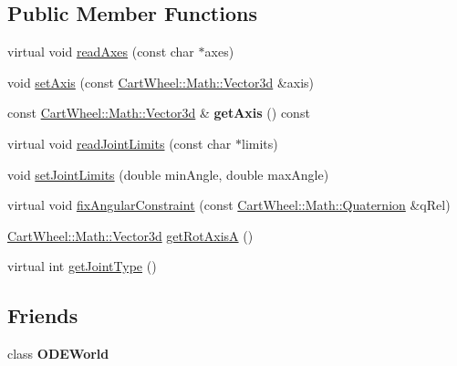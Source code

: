 \subsection*{Public Member Functions}
\begin{DoxyCompactItemize}
\item 
virtual void \hyperlink{classCartWheel_1_1Physics_1_1HingeJoint_a03be2b3b0d8b82d646f2c5b343d19faa}{readAxes} (const char $\ast$axes)
\item 
void \hyperlink{classCartWheel_1_1Physics_1_1HingeJoint_ad1f3776125f03d67f5abbc90453d28ce}{setAxis} (const \hyperlink{classCartWheel_1_1Math_1_1Vector3d}{CartWheel::Math::Vector3d} \&axis)
\item 
\hypertarget{classCartWheel_1_1Physics_1_1HingeJoint_ac22ef642193e3ee78a986632c626b5ae}{
const \hyperlink{classCartWheel_1_1Math_1_1Vector3d}{CartWheel::Math::Vector3d} \& {\bfseries getAxis} () const }
\label{classCartWheel_1_1Physics_1_1HingeJoint_ac22ef642193e3ee78a986632c626b5ae}

\item 
virtual void \hyperlink{classCartWheel_1_1Physics_1_1HingeJoint_a1e8d5fd7165a0cc0d669775ac95ab53f}{readJointLimits} (const char $\ast$limits)
\item 
void \hyperlink{classCartWheel_1_1Physics_1_1HingeJoint_a2d54017b1dcff97409aae453f0b3ab58}{setJointLimits} (double minAngle, double maxAngle)
\item 
virtual void \hyperlink{classCartWheel_1_1Physics_1_1HingeJoint_a0245e9da2588e69062102bb6750906d0}{fixAngularConstraint} (const \hyperlink{classCartWheel_1_1Math_1_1Quaternion}{CartWheel::Math::Quaternion} \&qRel)
\item 
\hyperlink{classCartWheel_1_1Math_1_1Vector3d}{CartWheel::Math::Vector3d} \hyperlink{classCartWheel_1_1Physics_1_1HingeJoint_a504ac0c55bb16688748fe19e462b0dcf}{getRotAxisA} ()
\item 
virtual int \hyperlink{classCartWheel_1_1Physics_1_1HingeJoint_ac235a55558abc285ec5bc3bd19e3a2da}{getJointType} ()
\end{DoxyCompactItemize}
\subsection*{Friends}
\begin{DoxyCompactItemize}
\item 
\hypertarget{classCartWheel_1_1Physics_1_1HingeJoint_a5db30e1aef955cb40c04658eacff8680}{
class {\bfseries ODEWorld}}
\label{classCartWheel_1_1Physics_1_1HingeJoint_a5db30e1aef955cb40c04658eacff8680}

\end{DoxyCompactItemize}


